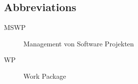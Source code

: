 \documentclass[a4paper,11pt]{article}
\begin{document}







\begin{appendix}

\pagebreak

{}




\pagebreak

\section*{Abbreviations}
 
 \begin{description}
  \item[MSWP] Management von Software Projekten
  \item[WP] Work Package
 \end{description}

\end{appendix}
\end{document}
